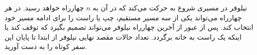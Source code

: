 \p
    نیلوفر در مسیری شروع به حرکت می‌کند که در آن به
    $n$
    چهارراه خواهد رسید.
    در هر چهارراه می‌تواند یکی از سه مسیر مستقیم، چپ یا راست را برای ادامه مسیر خود انتخاب کند. پس از عبور از آخرین چهارراه نیلوفر می‌تواند تصمیم بگیرد که توقف کند یا اینکه یک راست به خانه برگردد. تعداد حالات مقصد نهایی نیلوفر از ابتدا تا پایان این سفر کوتاه را به دست آورید.
    

